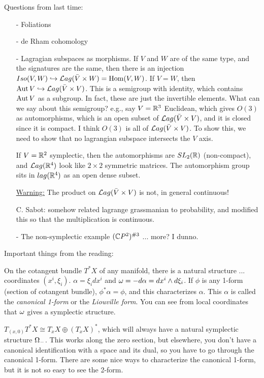  \setcounter{lecture}{3}

 Questions from last time:
 \begin{itemize}
 \item[-] Foliations
 \item[-] de Rham cohomology
 \item[-] Lagragian subspaces as morphisms. If $V$ and $W$ are
 of the same type, and the signatures are the same, then there is
 an injection $Iso(V,W)\hookrightarrow \mathcal{L}ag(\bar V\times W) = \text{\rm Hom}(V,W)$.  If
 $V=W$, then $\text{\rm Aut}\, V\hookrightarrow \mathcal{L}ag(\bar V\times V)$.  This
 is a semigroup with identity, which contains $\text{\rm Aut}\, V$ as a
 subgroup.  In fact, these are just the invertible elements.  What
 can we say about this semigroup? e.g., say $V=\mathbb{R}^3$ Euclidean,
 which gives $O(3)$ as automorphisms, which is an open subset of
 $\mathcal{L}ag(\bar V\times V)$, and it is closed since it is compact.
 I think $O(3)$ is all of $\mathcal{L}ag(\bar V\times V)$.  To show this,
 we need to show that no lagrangian subspace intersects the $V$
 axis.

 If $V=\mathbb{R}^2$ symplectic, then the automorphisms are $SL_2(\mathbb{R})$ (non-compact),
 and $\mathcal{L}ag(\mathbb{R}^4)$ look like $2\times 2$ symmetric matrices.  The
 automorphism group sits in $lag(\mathbb{R}^4)$ as an open dense subset.

 \underline{Warning:} The product on $\mathcal{L}ag(\bar V\times V)$ is
 not, in general continuous!


 C. Sabot: somehow related lagrange grassmanian to probability,
 and modified this so that the multiplication is continuous.

 \item[-] The non-symplectic example $(\mathbb{C} P^2)^{\# 3}$ ... more?
 I dunno.
 \end{itemize}

 Important things from the reading:

 On the cotangent bundle $T^*X$ of any manifold, there is
 a natural structure ... coordinates $(x^i,\xi_i)$.  $\alpha=\xi_i
 dx^i$ and $\omega=-d\alpha = dx^i\wedge d\xi_i$.  If $\phi$ is any
 1-form (section of cotangent bundle), $\phi^*\alpha=\phi$, and
 this characterizes $\alpha$.  This $\alpha$ is called the
 \emph{canonical 1-form} or the \emph{Liouville form}.  You can
 see from local coordinates that $\omega$ gives a symplectic
 structure.

 $T_{(x,0)}T^*X \cong T_xX\oplus (T_xX)^*$, which will always have
 a natural symplectic structure $\Omega_-$.  This works along the zero
 section, but elsewhere, you don't have a canonical
 identification with a space and its dual, so you have to go
 through the canonical 1-form.  There are some nice ways to
 characterize the canonical 1-form, but it is not so easy to see
 the 2-form.

